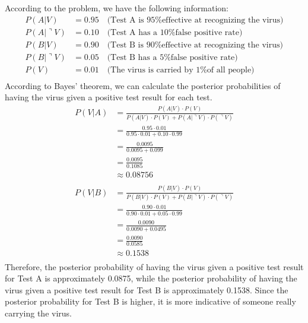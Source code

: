 \documentclass[cn,12pt]{homework}
\begin{document}
\begin{solution}
\quad

According to the problem, we have the following information:
\begin{align*}
P(A|V) &= 0.95 \quad \text{(Test A is 95\% effective at recognizing the virus)} \\
P(A|\urcorner V) &= 0.10 \quad \text{(Test A has a 10\% false positive rate)} \\
P(B|V) &= 0.90 \quad \text{(Test B is 90\% effective at recognizing the virus)} \\
P(B|\urcorner V) &= 0.05 \quad \text{(Test B has a 5\% false positive rate)} \\
P(V) &= 0.01 \quad \text{(The virus is carried by 1\% of all people)} \\
\end{align*}
According to Bayes' theorem, we can calculate the posterior probabilities of having the virus given a positive test result for each test.
\begin{align*}
P(V|A) &= \frac{P(A|V) \cdot P(V)}{P(A|V) \cdot P(V) + P(A|\urcorner V) \cdot P(\urcorner V)} \\
&= \frac{0.95 \cdot 0.01}{0.95 \cdot 0.01 + 0.10 \cdot 0.99} \\
&= \frac{0.0095}{0.0095 + 0.099} \\
&= \frac{0.0095}{0.1085} \\
&\approx 0.08756 \\
\end{align*}
\begin{align*}
P(V|B) &= \frac{P(B|V) \cdot P(V)}{P(B|V) \cdot P(V) + P(B|\urcorner V) \cdot P(\urcorner V)} \\
&= \frac{0.90 \cdot 0.01}{0.90 \cdot 0.01 + 0.05 \cdot 0.99} \\
&= \frac{0.0090}{0.0090 + 0.0495} \\
&= \frac{0.0090}{0.0585} \\
&\approx 0.1538 \\
\end{align*}
Therefore, the posterior probability of having the virus given a positive test result for Test A is approximately 0.0875, while the posterior probability of having the virus given a positive test result for Test B is approximately 0.1538. Since the posterior probability for Test B is higher, it is more indicative of someone really carrying the virus.



\end{solution}
\end{document}
